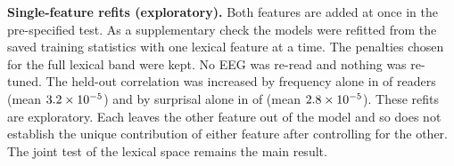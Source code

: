 \documentclass[sigconf]{acmart}
\newcommand{\tenm}[1]{#1\times10^{-5}}
\begin{document}
\textbf{Single-feature refits (exploratory).} Both features are added at once in the pre-specified test. As a supplementary check the models were refitted from the saved training statistics with one lexical feature at a time. The penalties chosen for the full lexical band were kept. No EEG was re-read and nothing was re-tuned. The held-out correlation was increased by frequency alone in \looFreqPos{} of \nSubj{} readers (mean $\tenm{\looFreqMean}$) and by surprisal alone in \looSurpPos{} of \nSubj{} (mean $\tenm{\looSurpMean}$). These refits are exploratory. Each leaves the other feature out of the model and so does not establish the unique contribution of either feature after controlling for the other. The joint test of the lexical space remains the main result.

\begin{table}
\caption{Post hoc nulls on the second read per reader.}
\label{tab:nulls}
\footnotesize

\end{table}
\end{document}
